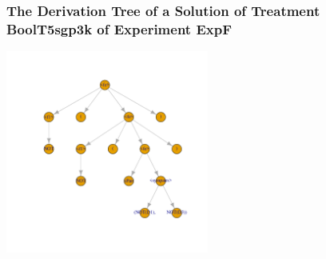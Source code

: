 \begin{frame}
 \frametitle{ The Derivation Tree of a Solution of Treatment BoolT5sgp3k of Experiment ExpF }
 \begin{center}
\includegraphics[width=0.5\textwidth, angle=0]
{ExpFDerivationTreeFigure004.pdf}
 \end{center}
 \label{report/ExpFDerivationTreeFigure004.pdf}  
 \end{frame}

